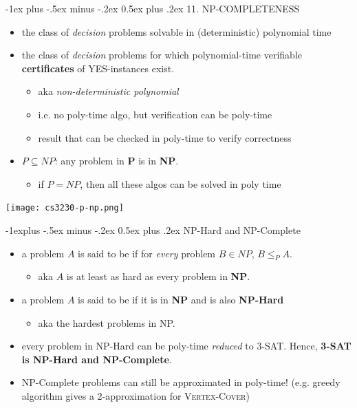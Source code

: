 \documentclass[10pt, landscape]{article}
\makeatletter
\renewcommand{\section}{\@startsection{section}{1}{0mm}%
  {-1ex plus -.5ex minus -.2ex}%
  {0.5ex plus .2ex}%
{\normalfont\large\bfseries}}
\renewcommand{\subsection}{\@startsection{subsection}{2}{0mm}%
  {-1explus -.5ex minus -.2ex}%
  {0.5ex plus .2ex}%
{\normalfont\normalsize\bfseries}}
\makeatother
\begin{document}
\begin{multicols*}{4}
  \section{11. NP-COMPLETENESS}

  \begin{itemize}
    \item {} the class of \textit{decision} problems solvable in (deterministic) polynomial time
    \item {} the class of \textit{decision} problems for which polynomial-time verifiable \textbf{certificates} of YES-instances exist.
      \begin{itemize}
        \item aka \textit{non-deterministic polynomial}
        \item i.e. no poly-time algo, but verification can be poly-time
        \item {} result that can be checked in poly-time to verify correctness
      \end{itemize}
    \item $P \subseteq NP$: any problem in \textbf{P} is in \textbf{NP}.
      \begin{itemize}
        \item if $P=NP$, then all these algos can be solved in poly time
      \end{itemize}
  \end{itemize}

  \texttt{[image: cs3230-p-np.png]} 

  \subsection{NP-Hard and NP-Complete}

  \begin{itemize}
    \item a problem $A$ is said to be  if for \textit{every} problem $B \in NP$, $B \leq_P A$.
      \begin{itemize}
        \item aka $A$ is at least as hard as every problem in \textbf{NP}.
      \end{itemize}
    \item a problem $A$ is said to be  if it is in \textbf{NP} and is also \textbf{NP-Hard}
      \begin{itemize}
        \item aka the hardest problems in NP.
      \end{itemize}
    \item {} every problem in NP-Hard can be poly-time \textit{reduced} to 3-SAT. Hence, \textbf{3-SAT is NP-Hard and NP-Complete}.
    \item NP-Complete problems can still be approximated in poly-time! (e.g. greedy algorithm gives a 2-approximation for \textsc{Vertex-Cover})
  \end{itemize}


\end{multicols*}
\end{document}
